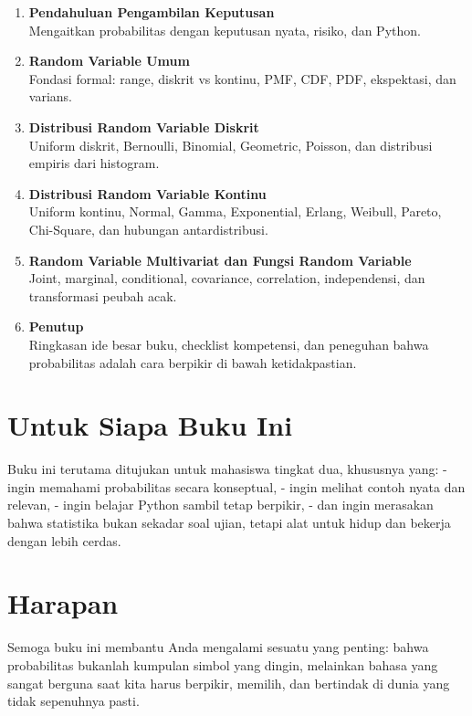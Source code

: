 \documentclass[
  letterpaper,
  DIV=11,
  numbers=noendperiod]{scrreprt}
\begin{document}
\begin{enumerate}
\def\labelenumi{\arabic{enumi}.}
\item
  \textbf{Pendahuluan Pengambilan Keputusan}\\
  Mengaitkan probabilitas dengan keputusan nyata, risiko, dan Python.
\item
  \textbf{Random Variable Umum}\\
  Fondasi formal: range, diskrit vs kontinu, PMF, CDF, PDF, ekspektasi,
  dan varians.
\item
  \textbf{Distribusi Random Variable Diskrit}\\
  Uniform diskrit, Bernoulli, Binomial, Geometric, Poisson, dan
  distribusi empiris dari histogram.
\item
  \textbf{Distribusi Random Variable Kontinu}\\
  Uniform kontinu, Normal, Gamma, Exponential, Erlang, Weibull, Pareto,
  Chi-Square, dan hubungan antardistribusi.
\item
  \textbf{Random Variable Multivariat dan Fungsi Random Variable}\\
  Joint, marginal, conditional, covariance, correlation, independensi,
  dan transformasi peubah acak.
\item
  \textbf{Penutup}\\
  Ringkasan ide besar buku, checklist kompetensi, dan peneguhan bahwa
  probabilitas adalah cara berpikir di bawah ketidakpastian.
\end{enumerate}

\section{Untuk Siapa Buku Ini}\label{untuk-siapa-buku-ini}

Buku ini terutama ditujukan untuk mahasiswa tingkat dua, khususnya yang:
- ingin memahami probabilitas secara konseptual, - ingin melihat contoh
nyata dan relevan, - ingin belajar Python sambil tetap berpikir, - dan
ingin merasakan bahwa statistika bukan sekadar soal ujian, tetapi alat
untuk hidup dan bekerja dengan lebih cerdas.

\section{Harapan}\label{harapan}

Semoga buku ini membantu Anda mengalami sesuatu yang penting: bahwa
probabilitas bukanlah kumpulan simbol yang dingin, melainkan bahasa yang
sangat berguna saat kita harus berpikir, memilih, dan bertindak di dunia
yang tidak sepenuhnya pasti.
\end{document}
